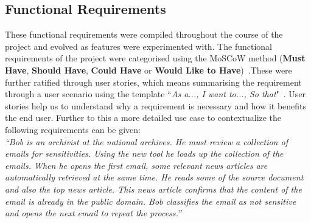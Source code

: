 \documentclass{l4proj}
\begin{document}
\subsection{Functional Requirements}
These functional requirements were compiled throughout the course of the project and evolved as features were experimented with.
The functional requirements of the project were categorised using the MoSCoW method (\textbf{Must Have}, \textbf{Should Have}, \textbf{Could Have} or \textbf{Would Like to Have})~\cite{storer_lecture_2014}.These were further ratified through user stories, which means summarising the requirement through a user scenario using the template ``\textit{As a..., I want to..., So that}"~\cite{storer_lecture_2014}. User stories help us to understand why a requirement is necessary and how it benefits the end user. Further to this a more detailed use case to contextualize the following requirements can be given:\\ 
\textit{``Bob is an archivist at the national archives. He must review a collection of emails for sensitivities. Using the new tool he loads up the collection of the emails. When he opens the first email, some relevant news articles are automatically retrieved at the same time. He reads some of the source document and also the top news article. This news article confirms that the content of the email is already in the public domain. Bob classifies the email as not sensitive and opens the next email to repeat the process.''}
\end{document}
